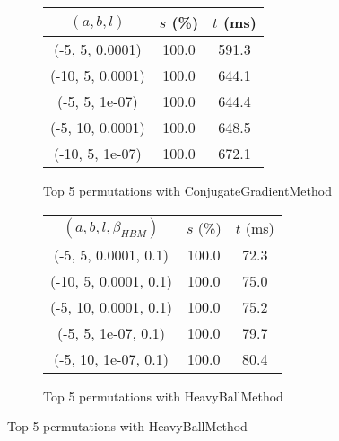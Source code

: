\begin{figure}[H]
\begin{subfigure}[ht]{.5\textwidth}
\begin{tabular}{|c|c|c|}
\hline
\rowcolor{gray!25}
$(a,b,l)$ & $s$ (\%) & $t$ (ms) \\
\hline
(-5, 5, 0.0001) & 100.0 & 591.3 \\
(-10, 5, 0.0001) & 100.0 & 644.1 \\
(-5, 5, 1e-07) & 100.0 & 644.4 \\
(-5, 10, 0.0001) & 100.0 & 648.5 \\
(-10, 5, 1e-07) & 100.0 & 672.1 \\
\hline
\end{tabular}
\caption{Top 5 permutations with ConjugateGradientMethod}
\label{subfig:param_comp_NegativeEntropy_ConjugateGradientMethod_GoldenSectionSearch}
\end{subfigure}
\hfill
\begin{subfigure}[ht]{.5\textwidth}
\begin{tabular}{|c|c|c|}
\hline
\rowcolor{gray!25}
\multicolumn{3}{|c|}{HeavyBallMethod} \\
\hline
\rowcolor{gray!25}
$(a,b,l,\beta_{HBM})$ & $s$ (\%) & $t$ (ms) \\
\hline
(-5, 5, 0.0001, 0.1) & 100.0 & 72.3 \\
(-10, 5, 0.0001, 0.1) & 100.0 & 75.0 \\
(-5, 10, 0.0001, 0.1) & 100.0 & 75.2 \\
(-5, 5, 1e-07, 0.1) & 100.0 & 79.7 \\
(-5, 10, 1e-07, 0.1) & 100.0 & 80.4 \\
\hline
\end{tabular}
\caption{Top 5 permutations with HeavyBallMethod}
\label{subfig:param_comp_NegativeEntropy_HeavyBallMethod_GoldenSectionSearch}
\end{subfigure}
\end{figure}